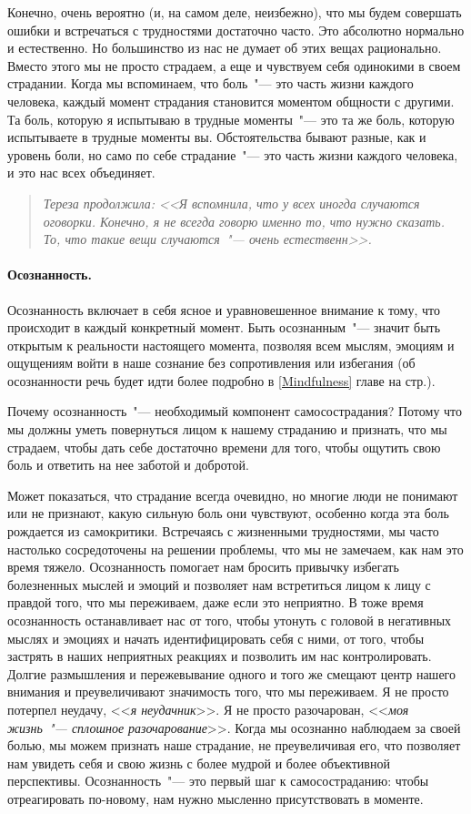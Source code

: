 Конечно, очень вероятно (и, на самом деле, неизбежно), что мы будем совершать ошибки и встречаться с трудностями достаточно часто. Это абсолютно нормально и естественно. Но большинство из нас не думает об этих вещах рационально. Вместо этого мы не просто страдаем, а еще и чувствуем себя одинокими в своем страдании. Когда мы вспоминаем, что боль~"--- это часть жизни каждого человека, каждый момент страдания становится моментом общности с другими. Та боль, которую я испытываю в трудные моменты~"--- это та же боль, которую испытываете в трудные моменты вы. Обстоятельства бывают разные, как и уровень боли, но само по себе страдание~"--- это часть жизни каждого человека, и это нас всех объединяет. 

\begin{quote}
	\textit{Тереза продолжила: <<Я вспомнила, что у всех иногда случаются оговорки. Конечно, я не всегда говорю именно то, что нужно сказать. То, что такие вещи случаются~"--- очень естественн>>.} 
\end{quote}

\paragraph{Осознанность.} Осознанность включает в себя ясное и уравновешенное внимание к тому, что происходит в каждый конкретный момент. Быть осознанным~"--- значит быть открытым к реальности настоящего момента, позволяя всем мыслям, эмоциям и ощущениям войти в наше сознание без сопротивления или избегания (об осознанности речь будет идти более подробно в \ref{Mindfulness} главе на стр.\:\pageref{Mindfulness}). 

Почему осознанность~"--- необходимый компонент самосострадания? Потому что мы должны уметь повернуться лицом к нашему страданию и признать, что мы страдаем, чтобы дать себе достаточно времени для того, чтобы ощутить свою боль и ответить на нее заботой и добротой.
 
Может показаться, что страдание всегда очевидно, но многие люди не понимают или не признают, какую сильную боль они чувствуют, особенно когда эта боль рождается из самокритики. Встречаясь с жизненными трудностями, мы часто настолько сосредоточены на решении проблемы, что мы не замечаем, как нам  это время тяжело. Осознанность помогает нам бросить привычку избегать болезненных мыслей и эмоций и позволяет нам встретиться лицом к лицу с правдой того, что мы переживаем, даже если это неприятно. В тоже время осознанность останавливает нас от того, чтобы утонуть с головой в негативных мыслях и эмоциях и начать идентифицировать себя с ними, от того, чтобы застрять в наших неприятных реакциях и позволить им нас контролировать. Долгие размышления и пережевывание одного и того же смещают центр нашего внимания и преувеличивают значимость того, что мы переживаем. Я не просто потерпел неудачу, <<\emph{я неудачник}>>. Я не просто разочарован, <<\emph{моя жизнь~"--- сплошное разочарование}>>. Когда мы осознанно наблюдаем за своей болью, мы можем признать наше страдание, не преувеличивая его, что позволяет нам увидеть себя и свою жизнь с более мудрой и более объективной перспективы. Осознанность~"--- это первый шаг к самосостраданию: чтобы отреагировать по-новому, нам нужно мысленно присутствовать в моменте.
 
